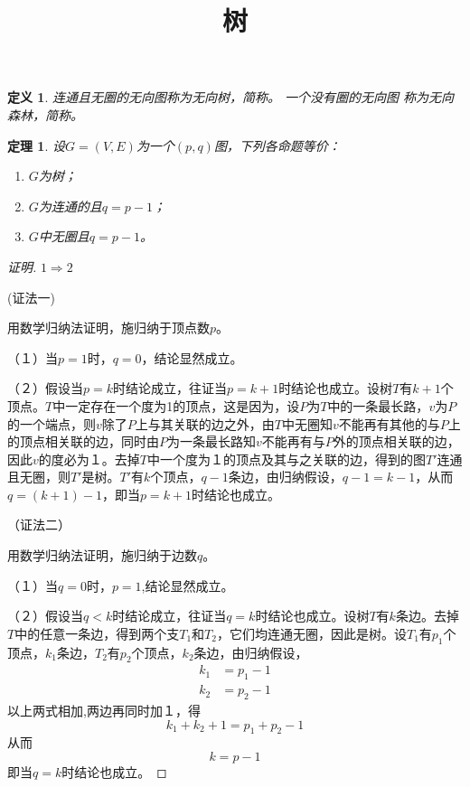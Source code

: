 \documentclass{book}[oneside]
\newtheorem{Def}{定义}
\newtheorem{Thm}{定理}
\begin{document}
\begin{CJK*}{UTF8}{gbsn}
  \title{树}
  \author{}
  \date{}
  \maketitle
  


  \setcounter{chapter}{6}
  \begin{Def}
    连通且无圈的无向图称为无向树，简称{}。 一个没有圈的无向图
    称为无向森林，简称{}。
  \end{Def}

  \begin{Thm}
  设$G=(V,E)$为一个$(p,q)$图，下列各命题等价：
  \begin{enumerate}
  \item $G$为树；
  \item $G$为连通的且$q = p - 1$；
  \item $G$中无圈且$q = p - 1$。
  \end{enumerate}
\end{Thm}
\begin{proof}[证明]  \mbox{}\par{}

  $1\Rightarrow2$

  (证法一)
  
    用数学归纳法证明，施归纳于顶点数$p$。
    
    （１）当$p=1$时，$q=0$，结论显然成立。

    （２）假设当$p=k$时结论成立，往证当$p=k+1$时结论也成立。设树$T$有$k+1$个顶点。$T$中一定存在一个度为1的顶点，这是因为，设$P$为$T$中的一条最长路，$v$为$P$的一个端点，则$v$除了$P$上与其关联的边之外，由$T$中无圈知$v$不能再有其他的与$P$上的顶点相关联的边，同时由$P$为一条最长路知$v$不能再有与$P$外的顶点相关联的边，因此$v$的度必为１。去掉$T$中一个度为１的顶点及其与之关联的边，得到的图$T'$连通且无圈，则$T'$是树。$T'$有$k$个顶点，$q-1$条边，由归纳假设，$q-1 = k - 1$，从而$q = (k +1) - 1$，即当$p=k+1$时结论也成立。

    （证法二）
    
      用数学归纳法证明，施归纳于边数$q$。
    
    （１）当$q=0$时，$p=1$,结论显然成立。

    （２）假设当$q<k$时结论成立，往证当$q=k$时结论也成立。设树$T$有$k$条边。去掉$T$中的任意一条边，得到两个支$T_1$和$T_2$，它们均连通无圈，因此是树。设$T_1$有$p_1$个顶点，$k_1$条边，$T_2$有$p_2$个顶点，$k_2$条边，由归纳假设，
    \begin{equation*}
      \begin{split}
        k_1 &= p_1 - 1\\
        k_2 &= p_2 - 1
      \end{split}
    \end{equation*}
    以上两式相加,两边再同时加１，得
    \[k_1 + k_2  + 1 = p_1 + p_2 - 1\]
    从而
    \[k = p - 1 \]
    即当$q=k$时结论也成立。




\end{proof}
\end{CJK*}
\end{document}
